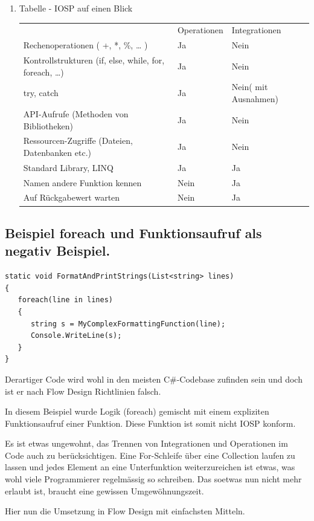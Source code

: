\documentclass[11pt]{article}
\begin{document}
\begin{enumerate}
\item Tabelle -  IOSP auf einen Blick
\label{sec:orgheadline23}


\begin{center}
\begin{tabular}{lll}
 & Operationen & Integrationen\\
Rechenoperationen ( +, *, \%, \ldots{} ) & Ja & Nein\\
Kontrollstrukturen (if, else, while, for, foreach, \ldots{}) & Ja & Nein\\
try, catch & Ja & Nein( mit Ausnahmen)\\
API-Aufrufe (Methoden von Bibliotheken) & Ja & Nein\\
Ressourcen-Zugriffe (Dateien, Datenbanken etc.) & Ja & Nein\\
Standard Library, LINQ & Ja & Ja\\
Namen andere Funktion kennen & Nein & Ja\\
Auf Rückgabewert warten & Nein & Ja\\
\end{tabular}
\end{center}
\end{enumerate}

\subsection{Beispiel foreach und Funktionsaufruf als negativ Beispiel.}
\label{sec:orgheadline26}
\begin{verbatim}
static void FormatAndPrintStrings(List<string> lines)
{
   foreach(line in lines)
   {
      string s = MyComplexFormattingFunction(line);
      Console.WriteLine(s);
   }
}
\end{verbatim}
Derartiger Code wird wohl in den meisten C\#-Codebase zufinden sein und doch ist er nach Flow Design Richtlinien falsch.

In diesem Beispiel wurde Logik (foreach) gemischt mit einem expliziten Funktionsaufruf einer Funktion.
Diese Funktion ist somit nicht IOSP konform.

Es ist etwas ungewohnt, das Trennen von Integrationen und Operationen im Code auch zu berücksichtigen.
Eine For-Schleife über eine Collection laufen zu lassen und jedes Element an eine Unterfunktion weiterzureichen ist etwas,
was wohl viele Programmierer regelmässig so schreiben.
Das soetwas nun nicht mehr erlaubt ist, braucht eine gewissen Umgewöhnungszeit.


Hier nun die Umsetzung in Flow Design mit einfachsten Mitteln.
\end{document}
